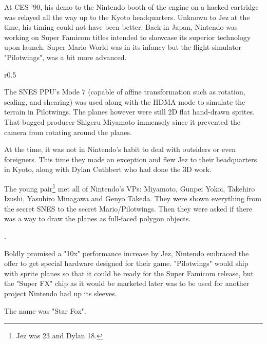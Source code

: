 At CES '90, his demo to the Nintendo booth of the engine on a hacked cartridge was relayed all the way up to the Kyoto headquarters. Unknown to Jez at the time, his timing could not have been better. Back in Japan, Nintendo was working on Super Famicom titles intended to showcase its superior technology upon launch. Super Mario World was in its infancy but the flight simulator "Pilotwings", was a bit more advanced.\\ 
\par
\begin{wrapfigure}[14]{r}{0.5\textwidth}{
\centering {}}
\end{wrapfigure}
The SNES PPU's Mode 7 (capable of affine transformation such as rotation, scaling, and shearing) was used along with the HDMA mode to simulate the terrain in Pilotwings. The planes however were still 2D flat hand-drawn sprites. That bugged producer Shigeru Miyamoto immensely since it prevented the camera from rotating around the planes.\\ \par
At the time, it was not in Nintendo's habit to deal with outsiders or even foreigners. This time they made an exception and flew Jez to their headquarters in Kyoto, along with Dylan Cuthbert who had done the 3D work.\\
\par
 The young pair\footnote{Jez was 23 and Dylan 18.} met all of Nintendo's VPs: Miyamoto, Gunpei Yokoi, Takehiro Izushi, Yasuhiro Minagawa and Genyo Takeda. They were shown everything from the secret SNES to the secret Mario/Pilotwings. Then they were asked if there was a way to draw the planes as full-faced polygon objects.\\
\par
{}.\\
\par

Boldly promised a "10x" performance increase by Jez, Nintendo embraced the offer to get special hardware designed for their game. "Pilotwings" would ship with sprite planes so that it could be ready for the Super Famicom release, but the "Super FX" chip as it would be marketed later was to be used for another project Nintendo had up its sleeves.\\
\par
The name was "Star Fox".

